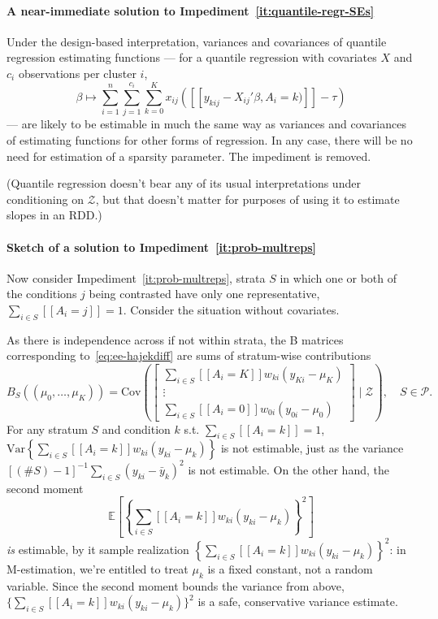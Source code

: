 \paragraph*{A near-immediate solution to
  Impediment~\ref{it:quantile-regr-SEs}}
Under the design-based interpretation, variances and covariances of
quantile regression estimating functions --- for a quantile regression
with covariates $X$ and $c_{i}$ observations per cluster $i$,
\begin{equation*}
\beta \mapsto  \sum_{i=1}^{n}\sum_{j=1}^{c_{i}}\sum_{k=0}^{K} x_{ij}([\![y_{kij} -
  X_{ij}'\beta, A_{i}= k)]\!] - \tau)
\end{equation*}
\citep[][\S2.7]{he18resampling} --- are likely to be estimable in
much the same way as variances and covariances of estimating functions
for other forms of regression.  In any case, there will be no need for
estimation of a sparsity parameter.  The impediment is removed.

(Quantile regression doesn't bear any of its usual interpretations
under conditioning on $\mathcal{Z}$, but that doesn't matter for
purposes of using it to estimate slopes in an RDD.)

\paragraph*{Sketch of a solution to Impediment~\ref{it:prob-multreps}}
Now consider Impediment~\ref{it:prob-multreps},  strata $S$ in which one
or both of the conditions $j$ being contrasted have only one 
representative, $\sum_{i\in S} [\![A_{i}=j]\!] =1$. Consider the situation without covariates. 

As there is independence across if not within strata, the
B matrices corresponding to~\eqref{eq:ee-hajekdiff} are sums of
stratum-wise contributions 
\begin{equation} \label{eq:Bform}
B_S((\mu_0, \ldots, \mu_K)) =  
\mathrm{Cov}\left(\left[
\begin{array}{c}
\sum_{i\in S} [\![A_i=K]\!] w_{ki} (y_{Ki} - \mu_K) \\
\vdots \\
\sum_{i\in S} [\![A_i=0]\!] w_{0i} (y_{0i} - \mu_0) 
\end{array}
\right] \mid \mathcal{Z}\right), \quad S \in \mathcal{P}. 
\end{equation}
For any stratum $S$ and condition $k$ s.t.  $\sum_{i \in S}  [\![A_i=k]\!] =1$, $\mathrm{Var}\left\{ \sum_{i\in S} [\![A_i=k]\!] w_{ki} (y_{ki} - \mu_k) \right\}$ is not estimable, just as the variance $[(\# S)-1]^{-1}\sum_{i \in S} (y_{ki} - \bar{y}_k)^2$ is not estimable. On the other hand, the second moment 
\[ \mathbb{E}\left[\left\{ \sum_{i\in S} [\![A_i=k]\!] w_{ki} (y_{ki} - \mu_k) \right\}^2\right]
\]
\textit{is} estimable, by it sample realization \(\left\{ \sum_{i\in
    S} [\![A_i=k]\!] w_{ki} (y_{ki} - \mu_k) \right\}^2\): in
M-estimation, we're entitled to treat $\mu_k$ is a fixed constant, not
a random variable. Since the second moment  bounds the variance from above,  \(\{\sum_{i\in S} [\![A_i=k]\!] w_{ki} (y_{ki} - \mu_k)\}^2\) is a safe, conservative variance estimate.  

